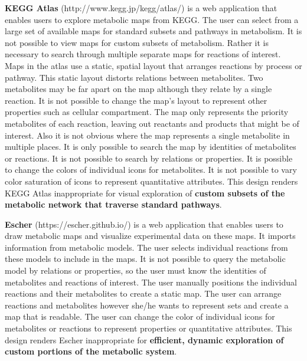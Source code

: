\textbf{KEGG Atlas} (http://www.kegg.jp/kegg/atlas/) \supercite{kanehisa_kegg_2016} is a web application that enables users to explore metabolic maps from KEGG.
The user can select from a large set of available maps for standard subsets and pathways in metabolism.
It is not possible to view maps for custom subsets of metabolism.
Rather it is necessary to search through multiple separate maps for reactions of interest.
Maps in the atlas use a static, spatial layout that arranges reactions by process or pathway.
This static layout distorts relations between metabolites.
Two metabolites may be far apart on the map although they relate by a single reaction.
It is not possible to change the map's layout to represent other properties such as cellular compartment.
The map only represents the priority metabolites of each reaction, leaving out reactants and products that might be of interest.
Also it is not obvious where the map represents a single metabolite in multiple places.
It is only possible to search the map by identities of metabolites or reactions.
It is not possible to search by relations or properties.
It is possible to change the colors of individual icons for metabolites.
It is not possible to vary color saturation of icons to represent quantitative attributes.
This design renders KEGG Atlas inappropriate for visual exploration of \textbf{custom subsets of the metabolic network that traverse standard pathways}.

\textbf{Escher} \supercite{king_escher:_2015} (https://escher.github.io/) is a web application that enables users to draw metabolic maps and visualize experimental data on these maps.
It imports information from metabolic models.
The user selects individual reactions from these models to include in the maps.
It is not possible to query the metabolic model by relations or properties, so the user must know the identities of metabolites and reactions of interest.
The user manually positions the individual reactions and their metabolites to create a static map.
The user can arrange reactions and metabolites however she/he wants to represent sets and create a map that is readable.
The user can change the color of individual icons for metabolites or reactions to represent  properties or quantitative attributes.
This design renders Escher inappropriate for \textbf{efficient, dynamic exploration of custom portions of the metabolic system}.
